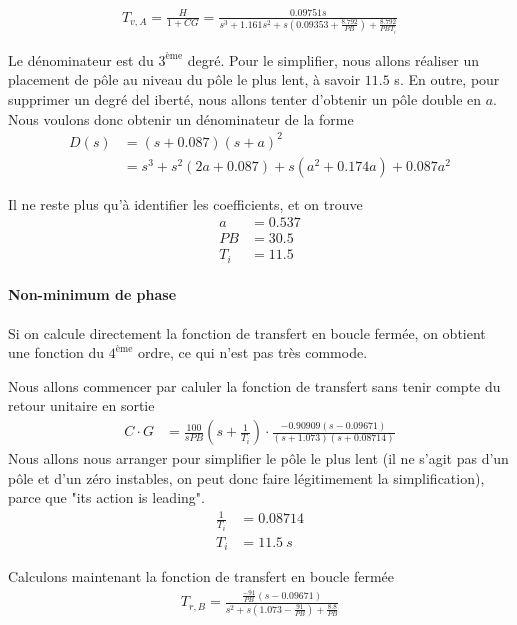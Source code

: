 \documentclass[frenchb, paper=a4, fontsize=11pt]{scrartcl}
\numberwithin{equation}{section}					%
\numberwithin{figure}{section}					%
\numberwithin{table}{section}						%
\begin{document}
\begin{align*}
T_{v,A}= \frac{H}{1+CG}= \frac{0.09751s}{s^3+1.161 s^2 + s(0.09353 + \frac{8.792}{PB}) + \frac{8.792}{PB T_i}}
\end{align*}

Le dénominateur est du $3^{\text{ème}}$ degré. Pour le simplifier, nous allons réaliser un placement de pôle au niveau du pôle le plus lent, à savoir $11.5$ s. En outre, pour supprimer un degré del iberté, nous allons tenter d'obtenir un pôle double en $a$.
Nous voulons donc obtenir un dénominateur de la forme
\begin{align*}
D(s) &= (s+0.087)(s+a)^2\\
&= s^3 + s^2 (2a+0.087) + s(a^2 + 0.174a) + 0.087a^2
\end{align*}

Il ne reste plus qu'à identifier les coefficients, et on trouve
\begin{align*}
a&=0.537\\
PB&=30.5\\
T_i &= 11.5
\end{align*}

\paragraph{Non-minimum de phase}

Si on calcule directement la fonction de transfert en boucle fermée, on obtient une fonction du $4^{\text{ème}}$ ordre, ce qui n'est pas très commode.

Nous allons commencer par caluler la fonction de transfert sans tenir compte du retour unitaire en sortie
\begin{align*}
C\cdot G &= \frac{100}{s PB}(s+\frac{1}{T_i}) \cdot \frac{-0.90909(s-0.09671)}{(s+1.073)(s+0.08714)}
\end{align*} 
Nous allons nous arranger pour simplifier le pôle le plus lent (il ne s'agit pas d'un pôle et d'un zéro instables, on peut donc faire légitimement la simplification), parce que "its action is leading".
\begin{align*}
\frac{1}{T_i} &= 0.08714\\
T_i &= 11.5\ s
\end{align*}


Calculons maintenant la fonction de transfert en boucle fermée
\begin{align*}
T_{r,B} = \frac{\frac{-91}{PB}(s-0.09671)}{s^2 + s (1.073-\frac{91}{PB}) + \frac{8.8}{PB}}
\end{align*}
\end{document}
